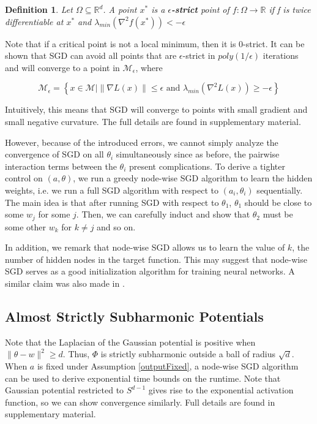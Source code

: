 \documentclass{article}
\newtheorem{definition}[theorem]{Definition}
\newcommand{\R}{{\mathbb{R}}}
\begin{document}
\begin{definition} Let $\Omega \subseteq \R^d$. A point $x^*$ is a {\bf $\epsilon$-strict} point of $f : \Omega \to \R$ if f is twice differentiable at $x^*$ and $\lambda_{min}(\nabla^2f(x^*)) < -\epsilon$
\end{definition}

Note that if a critical point is not a local minimum, then it is $0$-strict. It can be shown that SGD can avoid all points that are $\epsilon$-strict in $poly(1/\epsilon)$ iterations and will converge to a point in $\mathcal{M}_\epsilon$, where

\[\mathcal{M}_\epsilon = \left\{x\in \mathcal{M} \Big| \|\nabla L(x)\| \leq \epsilon \text{ and } \lambda_{min}(\nabla^2 L(x)) \geq -\epsilon\right\}\]

Intuitively, this means that SGD will converge to points with small gradient and small negative curvature. The full details are found in supplementary material. 

However, because of the introduced errors, we cannot simply analyze the convergence of SGD on all $\theta_i$ simultaneously since as before, the pairwise interaction terms between the $\theta_i$ present complications. To derive a tighter control on $(a,\theta)$, we run a greedy node-wise SGD algorithm to learn the hidden weights, i.e. we run a full SGD algorithm with respect to $(a_i,\theta_i)$ sequentially. The main idea is that after running SGD with respect to $\theta_1$, $\theta_1$ should be close to some $w_j$ for some $j$. Then, we can carefully induct and show that $\theta_2$ must be some other $w_k$ for $k\neq j$ and so on.

In addition, we remark that node-wise SGD allows us to learn the value of $k$, the number of hidden nodes in the target function. This may suggest that node-wise SGD serves as a good initialization algorithm for training neural networks. A similar claim was also made in \cite{WuM16}. 


\subsection{Almost Strictly Subharmonic Potentials}

Note that the Laplacian of the Gaussian potential is positive when $\|\theta - w \|^2 \geq d$. Thus, $\Phi$ is strictly subharmonic outside a ball of radius $\sqrt{d}$. When $a$ is fixed under Assumption \ref{outputFixed}, a node-wise SGD algorithm can be used to derive exponential time bounds on the runtime. Note that Gaussian potential restricted to $S^{d-1}$ gives rise to the exponential activation function, so we can show convergence similarly. Full details are found in supplementary material.  
\end{document}

